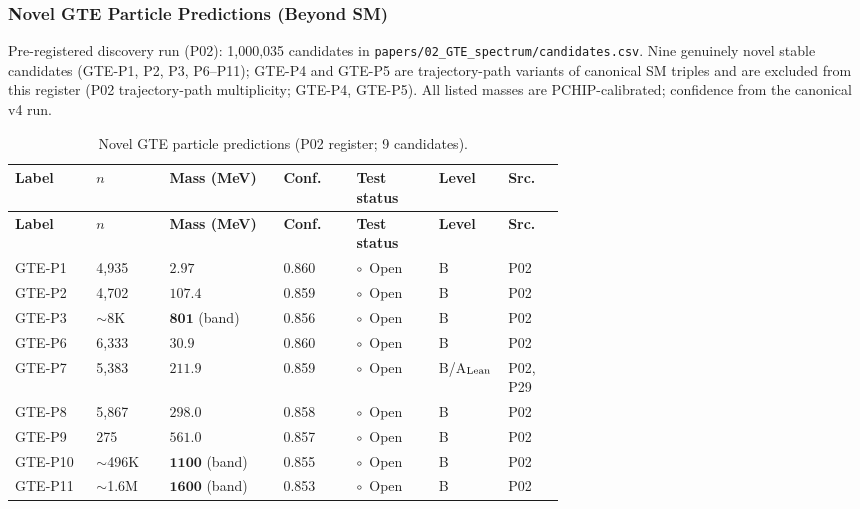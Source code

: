 \subsubsection{Novel GTE Particle Predictions (Beyond SM)}
\label{sec:mi-novel-particles}

{\small
Pre-registered discovery run (P02): 1,000,035 candidates in
\texttt{papers/02\_GTE\_spectrum/candidates.csv}.
Nine genuinely novel stable candidates (GTE-P1, P2, P3, P6--P11);
GTE-P4 and GTE-P5 are trajectory-path variants of canonical SM triples and are
excluded from this register (P02 trajectory-path multiplicity; GTE-P4, GTE-P5).
All listed masses are PCHIP-calibrated; confidence from the canonical v4 run.}

\begingroup\footnotesize\renewcommand{\arraystretch}{1.2}
\begin{longtable}{@{}P{0.10\linewidth}P{0.09\linewidth}P{0.14\linewidth}P{0.08\linewidth}P{0.10\linewidth}P{0.07\linewidth}P{0.06\linewidth}@{}}
\caption{Novel GTE particle predictions (P02 register; 9 candidates).}
\label{tab:mi-novel-particles}\\
\toprule
\textbf{Label} & \textbf{$n$} & \textbf{Mass (MeV)} &
  \textbf{Conf.} & \textbf{Test status} & \textbf{Level} & \textbf{Src.} \\
\midrule
\endfirsthead
\midrule
\textbf{Label} & \textbf{$n$} & \textbf{Mass (MeV)} &
  \textbf{Conf.} & \textbf{Test status} & \textbf{Level} & \textbf{Src.} \\
\midrule
\endhead
\bottomrule
\endfoot
GTE-P1 & 4,935 & $\mathbf{2.97}$ & 0.860 & $\circ$~Open & B & P02 \\
GTE-P2 & 4,702 & $\mathbf{107.4}$ & 0.859 & $\circ$~Open & B & P02 \\
GTE-P3 & $\sim$8K & $\mathbf{801}$ (band) & 0.856 & $\circ$~Open & B & P02 \\
GTE-P6 & 6,333 & $\mathbf{30.9}$ & 0.860 & $\circ$~Open & B & P02 \\
GTE-P7 & 5,383 & $\mathbf{211.9}$ & 0.859 & $\circ$~Open & B/A$_{\rm Lean}$ & P02, P29 \\
GTE-P8 & 5,867 & $\mathbf{298.0}$ & 0.858 & $\circ$~Open & B & P02 \\
GTE-P9 & 275 & $\mathbf{561.0}$ & 0.857 & $\circ$~Open & B & P02 \\
GTE-P10 & $\sim$496K & $\mathbf{1100}$ (band) & 0.855 & $\circ$~Open & B & P02 \\
GTE-P11 & $\sim$1.6M & $\mathbf{1600}$ (band) & 0.853 & $\circ$~Open & B & P02 \\
\end{longtable}
\endgroup

